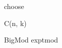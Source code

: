 

\begin{algorithm}{choose}
\complexity{}
\end{algorithm}

\begin{algorithm}{C(n, k)}
\complexity{}
\end{algorithm}

\begin{algorithm}{BigMod exptmod}
\complexity{}
\end{algorithm}
